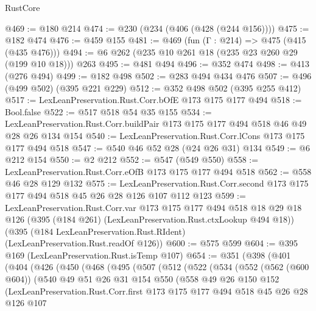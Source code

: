 \begin{lexlean}{RustCore}
\begin{coremodule}
@469 := @180 @214
@474 := @230 (@234 (@406 (@428 (@244 @156))))
@475 := @182 @474
@476 := @459 @155
@481 := @469 (fun (Γ : @214) => @475 (@415 (@435 @476)))
@494 := @6 @262 (@235 @10 @261 @18 (@235 @23 @260 @29 (@199 @10 @18))) @263
@495 := @481 @494
@496 := @352 @474
@498 := @413 (@276 @494)
@499 := @182 @498
@502 := @283 @494 @434 @476
@507 := @496 (@499 @502) (@395 @221 @229)
@512 := @352 @498 @502 (@395 @255 @412)
@517 := LexLeanPreservation.Rust.Corr.bOfE @173 @175 @177 @494
@518 := Bool.false
@522 := @517 @518 @54 @35 @155
@534 := LexLeanPreservation.Rust.Corr.buildPair @173 @175 @177 @494 @518 @46 @49 @28 @26 @134 @154
@540 := LexLeanPreservation.Rust.Corr.lCons @173 @175 @177 @494 @518
@547 := @540 @46 @52 @28 (@24 @26 @31) @134
@549 := @6 @212 @154
@550 := @2 @212
@552 := @547 (@549 @550)
@558 := LexLeanPreservation.Rust.Corr.eOfB @173 @175 @177 @494 @518
@562 := @558 @46 @28 @129 @132
@575 := LexLeanPreservation.Rust.Corr.second
    @173
    @175
    @177
    @494
    @518
    @45
    @26
    @28
    @126
    @107
    @112
    @123
@599 := LexLeanPreservation.Rust.Corr.var
    @173
    @175
    @177
    @494
    @518
    @18
    @29
    @18
    @126
    (@395 (@184 @261) (LexLeanPreservation.Rust.ctxLookup @494 @18))
    (@395 (@184 LexLeanPreservation.Rust.RIdent) (LexLeanPreservation.Rust.readOf @126))
@600 := @575 @599
@604 := @395 @169 (LexLeanPreservation.Rust.isTemp @107)
@654 := @351
    (@398
      (@401
        (@404
          (@426
            (@450
              (@468
                (@495
                  (@507
                    (@512
                      (@522
                        (@534
                          (@552
                            (@562 (@600 @604))
                            (@540
                              @49
                              @51
                              @26
                              @31
                              @154
                              @550
                              (@558
                                @49
                                @26
                                @150
                                @152
                                (LexLeanPreservation.Rust.Corr.first
                                  @173
                                  @175
                                  @177
                                  @494
                                  @518
                                  @45
                                  @26
                                  @28
                                  @126
                                  @107

\end{coremodule}
\end{lexlean}
